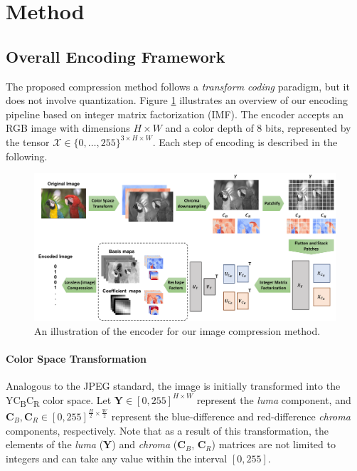 \section{Method} \label{sec:method}


\subsection{Overall Encoding Framework} \label{sec:overall_framework}

The proposed compression method follows a \emph{transform coding} paradigm, but it does not involve quantization. Figure \ref{fig:imf_encoder} illustrates an overview of our encoding pipeline based on integer matrix factorization (IMF). The encoder accepts an RGB image with dimensions $H \times W$ and a color depth of 8 bits, represented by the tensor $\bm{\mathcal{X}} \in \{0, \ldots, 255\}^{3 \times H \times W}$. Each step of encoding is described in the following.

\begin{figure}[!t]
    \centering
    \includegraphics[width=\textwidth]{figures/imf_encoder.pdf}
    \vspace{10pt}
    \caption{An illustration of the encoder for our image compression method.}
    \label{fig:imf_encoder}
\end{figure}

\paragraph{Color Space Transformation}
Analogous to the JPEG standard, the image is initially transformed into the YC\textsubscript{B}C\textsubscript{R} color space. Let $\bm{Y} \in [0, 255]^{H \times W}$ represent the \emph{luma} component, and $\bm{C}_B, \bm{C}_R \in [0, 255]^{\frac{H}{2} \times \frac{W}{2}}$ represent the blue-difference and red-difference \emph{chroma} components, respectively. Note that as a result of this transformation, the elements of the \emph{luma} ($\bm{Y}$) and \emph{chroma} ($\bm{C}_B$, $\bm{C}_R$) matrices are not limited to integers and can take any value within the interval $[0, 255]$.

